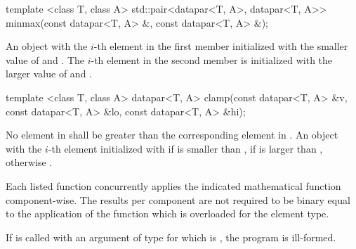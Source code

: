 \begin{itemdecl}
template <class T, class A>
std::pair<datapar<T, A>, datapar<T, A>> minmax(const datapar<T, A> &,
                                               const datapar<T, A> &);
\end{itemdecl}
\begin{itemdescr}
  \pnum\returns An object with the $i$-th element in the first  member initialized with the smaller value of  and  \foralli.
  The $i$-th element in the second  member is initialized with the larger value of  and  \foralli.
\end{itemdescr}

\begin{itemdecl}
template <class T, class A>
datapar<T, A> clamp(const datapar<T, A> &v, const datapar<T, A> &lo,
                    const datapar<T, A> &hi);
\end{itemdecl}
\begin{itemdescr}
  \pnum\requires No element in  shall be greater than the corresponding element in .
  \pnum\returns An object with the $i$-th element initialized with  if  is smaller than ,  if  is larger than , otherwise  \foralli.
\end{itemdescr}



\pnum Each listed function concurrently applies the indicated mathematical function component-wise.
The results per component are not required to be binary equal to the application of the function which is overloaded for the element type.

\pnum If  is called with an argument of type \datapar[<X, Abi>] for which  is \true, the program is ill-formed.

